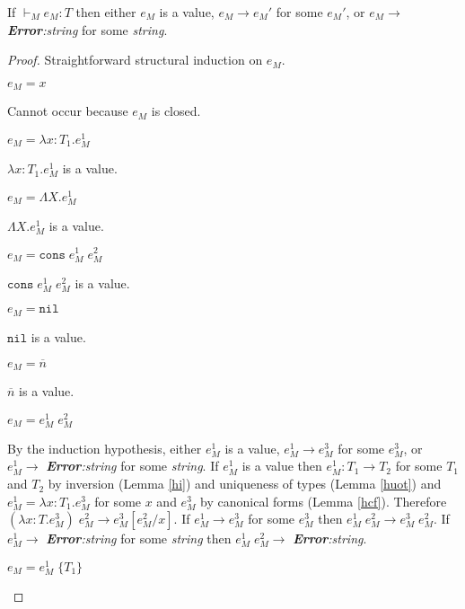 \begin{mps}
\label{mps}
If $\vdash_{M}e_{M}:T$ then either $e_{M}$ is a value, $e_{M}\rightarrow e_{M}'$ for some $e_{M}'$, or $e_{M}\rightarrow$ \emph{\textbf{Error}:\;string} for some \emph{string}.



\begin{proof}
Straightforward structural induction on $e_{M}$.
\begin{mps-case-1}
$e_{M}=x$

Cannot occur because $e_{M}$ is closed.
\end{mps-case-1}
\begin{mps-case-2}
$e_{M}=\lambda x:T_{1}.e_{M}^{1}$

$\lambda x:T_{1}.e_{M}^{1}$ is a value.
\end{mps-case-2}
\begin{mps-case-3}
$e_{M}=\Lambda X.e_{M}^{1}$

$\Lambda X.e_{M}^{1}$ is a value.
\end{mps-case-3}
\begin{mps-case-4}
$e_{M}=\mathtt{cons}\;e_{M}^{1}\;e_{M}^{2}$

$\mathtt{cons}\;e_{M}^{1}\;e_{M}^{2}$ is a value.
\end{mps-case-4}
\begin{mps-case-5}
$e_{M}=\mathtt{nil}$

$\mathtt{nil}$ is a value.
\end{mps-case-5}
\begin{mps-case-6}
$e_{M}=\overline{n}$

$\overline{n}$ is a value.
\end{mps-case-6}
\begin{mps-case-7}
$e_{M}=e_{M}^{1}\;e_{M}^{2}$

By the induction hypothesis, either $e_{M}^{1}$ is a value, $e_{M}^{1}\rightarrow e_{M}^{3}$ for some $e_{M}^{3}$, or $e_{M}^{1}\rightarrow$ \emph{\textbf{Error}:\;string} for some \emph{string}.  If $e_{M}^{1}$ is a value then $e_{M}^{1}:T_{1}\rightarrow T_{2}$ for some $T_{1}$ and $T_{2}$ by inversion (Lemma \ref{hi}) and uniqueness of types (Lemma \ref{huot}) and $e_{M}^{1}=\lambda x:T_{1}.e_{M}^{3}$ for some $x$ and $e_{M}^{3}$ by canonical forms (Lemma \ref{hcf}).  Therefore $(\lambda x:T.e_{M}^{3})\;e_{M}^{2}\rightarrow e_{M}^{3}[e_{M}^{2}/x]$.  If $e_{M}^{1}\rightarrow e_{M}^{3}$ for some $e_{M}^{3}$ then $e_{M}^{1}\;e_{M}^{2}\rightarrow e_{M}^{3}\;e_{M}^{2}$.  If $e_{M}^{1}\rightarrow$ \emph{\textbf{Error}:\;string} for some \emph{string} then $e_{M}^{1}\;e_{M}^{2}\rightarrow$ \emph{\textbf{Error}:\;string}.
\end{mps-case-7}
\begin{mps-case-8}
$e_{M}=e_{M}^{1}\;\lbrace T_{1}\rbrace$


\end{mps-case-8}
\end{proof}
\end{mps}
